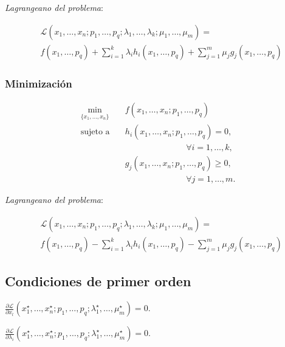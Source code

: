 \documentclass[8pt,a4paper]{extarticle}
\begin{document}
\begin{multicols}{3}
\emph{Lagrangeano del problema}:

\begin{equation*}
\begin{aligned}
	& \mathcal{L}(x_1, \ldots, x_n; p_1, \ldots, p_q; \lambda_1, \ldots, \lambda_k; \mu_1, \ldots, \mu_m) = \\
	& f(x_1,\ldots, p_q) + \sum_{i=1}^{k}\lambda_i h_i (x_1, \ldots, p_q) + \sum_{j=1}^{m}\mu_j g_j (x_1, \ldots, p_q)
\end{aligned}
\end{equation*}

\subsubsection*{Minimización}

\begin{equation*}
\begin{aligned}
	\min_{\{x_1, \ldots, x_n\}}\ & f(x_1, \ldots, x_n; p_1, \ldots, p_q) \\
	\text{sujeto a} \quad		& h_i(x_1, \ldots, x_n; p_1, \ldots, p_q) = 0,\\ & \qquad \qquad \qquad \quad \, \forall i = 1, \ldots, k, \\
								& g_j(x_1, \ldots, x_n; p_1, \ldots, p_q) \ge 0,\\ & \qquad \qquad \qquad \quad \, \forall j = 1, \ldots, m.
\end{aligned}
\end{equation*}

\emph{Lagrangeano del problema}:

\begin{equation*}
\begin{aligned}
	& \mathcal{L}(x_1, \ldots, x_n; p_1, \ldots, p_q; \lambda_1, \ldots, \lambda_k; \mu_1, \ldots, \mu_m) = \\
	& f(x_1,\ldots, p_q) - \sum_{i=1}^{k}\lambda_i h_i (x_1, \ldots, p_q) - \sum_{j=1}^{m}\mu_j g_j (x_1, \ldots, p_q)
\end{aligned}
\end{equation*}

\sectionbreak

\subsection*{Condiciones de primer orden}

\begin{bulletlist}
\item $\displaystyle \frac{\partial \mathcal{L}}{\partial x_l} (x_{1}^{\star}, \ldots, x_{n}^{\star}; p_1, \ldots, p_q; \lambda_{1}^{\star}, \ldots, \mu_{m}^{\star}) = 0$.
\item $\displaystyle \frac{\partial \mathcal{L}}{\partial \lambda_i} (x_{1}^{\star}, \ldots, x_{n}^{\star}; p_1, \ldots, p_q; \lambda_{1}^{\star}, \ldots, \mu_{m}^{\star}) = 0$.
\end{bulletlist}


\end{multicols}
\end{document}
